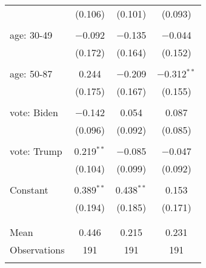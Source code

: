 \begin{tabular}{@{\extracolsep{5pt}}lccc}
  & (0.106) & (0.101) & (0.093) \\ 
  & & & \\ 
 age: 30-49 & $-$0.092 & $-$0.135 & $-$0.044 \\ 
  & (0.172) & (0.164) & (0.152) \\ 
  & & & \\ 
 age: 50-87 & 0.244 & $-$0.209 & $-$0.312$^{**}$ \\ 
  & (0.175) & (0.167) & (0.155) \\ 
  & & & \\ 
 vote: Biden & $-$0.142 & 0.054 & 0.087 \\ 
  & (0.096) & (0.092) & (0.085) \\ 
  & & & \\ 
 vote: Trump & 0.219$^{**}$ & $-$0.085 & $-$0.047 \\ 
  & (0.104) & (0.099) & (0.092) \\ 
  & & & \\ 
 Constant & 0.389$^{**}$ & 0.438$^{**}$ & 0.153 \\ 
  & (0.194) & (0.185) & (0.171) \\ 
  & & & \\ 
\hline \\[-1.8ex] 
Mean & 0.446 & 0.215 & 0.231 \\ 
Observations & 191 & 191 & 191 \\ 
\hline 
\hline \\[-1.8ex] 
\end{tabular} 
